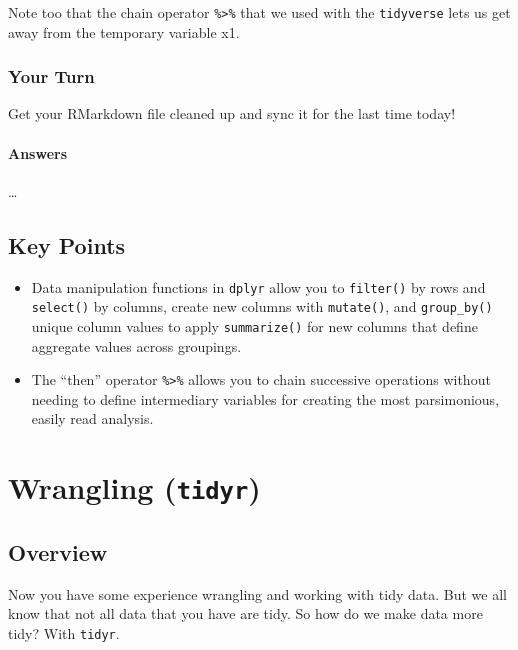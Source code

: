 \documentclass[]{book}
\providecommand{\tightlist}{%
  \setlength{\itemsep}{0pt}\setlength{\parskip}{0pt}}
\theoremstyle{definition}
\theoremstyle{definition}
\theoremstyle{definition}
\theoremstyle{remark}
\begin{document}
Note too that the chain operator \texttt{\%\textgreater{}\%} that we
used with the \texttt{tidyverse} lets us get away from the temporary
variable x1.

\subsection{Your Turn}\label{your-turn-8}

Get your RMarkdown file cleaned up and sync it for the last time today!

\subsubsection{Answers}\label{answers}

\ldots{}

\section{Key Points}\label{key-points}

\begin{itemize}
\tightlist
\item
  Data manipulation functions in \texttt{dplyr} allow you to
  \texttt{filter()} by rows and \texttt{select()} by columns, create new
  columns with \texttt{mutate()}, and \texttt{group\_by()} unique column
  values to apply \texttt{summarize()} for new columns that define
  aggregate values across groupings.
\item
  The ``then'' operator \texttt{\%\textgreater{}\%} allows you to chain
  successive operations without needing to define intermediary variables
  for creating the most parsimonious, easily read analysis.
\end{itemize}

\hypertarget{tidyr}{\chapter{\texorpdfstring{Wrangling
(\texttt{tidyr})}{Wrangling (tidyr)}}\label{tidyr}}

\section{Overview}\label{overview-1}

Now you have some experience wrangling and working with tidy data. But
we all know that not all data that you have are tidy. So how do we make
data more tidy? With \texttt{tidyr}.
\end{document}
